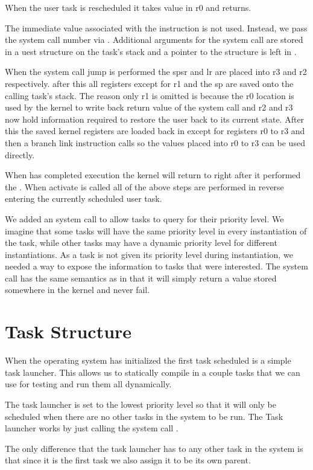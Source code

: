 \documentclass[pdftex,10pt,a4paper]{article}
\begin{document}
When the user task is rescheduled it takes value in r0 and returns.

The immediate value associated with the  instruction is not
used. Instead, we pass the system call number via . Additional
arguments for the system call are stored in a uest
structure on the task's stack and a pointer to the structure is left
in .

When the system call jump is performed the spsr and lr are placed into
r3 and r2 respectively. after this all registers except for r1 and the sp
are saved onto the calling task's stack. The reason only r1 is omitted is
because the r0 location is used by the kernel to write back return value of
the system call and r2 and r3 now hold information required to restore the user
back to its current state. After this the saved kernel registers are loaded back
in except for registers r0 to r3 and then a branch link instruction calls 
 so the values placed into r0 to r3 can be used directly.

When  has completed execution the kernel will return to right
after it performed the . When activate is called all of the
above steps are performed in reverse entering the currently scheduled user task.

We added an  system call to allow tasks to query
for their priority level. We imagine that some tasks will have the
same priority level in every instantiation of the task, while other
tasks may have a dynamic priority level for different
instantiations. As a task is not given its priority level during
instantiation, we needed a way to expose the information to tasks that
were interested. The  system call has the same
semantics as  in that it will simply return a value
stored somewhere in the kernel and never fail.

\section*{Task Structure}

When the operating system has initialized the first task scheduled is a simple
task launcher. This allows us to statically compile in a couple tasks that we
can use for testing and run them all dynamically.

The task launcher is set to the lowest priority level so that it will only be
scheduled when there are no other tasks in the system to be run. The Task launcher
works by just calling the system call .

The only difference that the task launcher has to any other task in the system
is that since it is the first task we also assign it to be its own parent.
\end{document}
